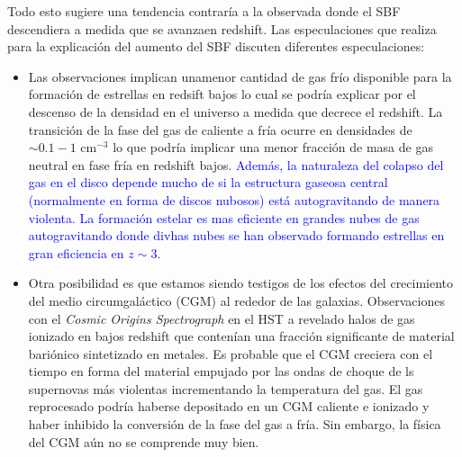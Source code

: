 Todo esto sugiere una tendencia contraría a la observada donde el SBF descendiera a medida que se avanzaen redshift. Las especulaciones que realiza \cite{finkelstein2015increasing} para la explicación del aumento del SBF discuten diferentes especulaciones:
\begin{itemize}
\item Las observaciones implican unamenor cantidad de gas frío disponible para la formación de estrellas en redsift bajos lo cual se podría explicar por el descenso de la densidad en el universo a medida que decrece el redshift. La transición de la fase del gas de caliente a fría ocurre en densidades de $\sim 0.1-1$ cm$^{-3}$ lo que podría implicar una menor fracción de masa de gas neutral en fase fría en redshift bajos. \textcolor{blue}{Además, la naturaleza del colapso del gas en el disco depende mucho de si la estructura gaseosa central (normalmente en forma de discos nubosos) está autogravitando de manera violenta. La formación estelar es mas eficiente en grandes nubes de gas autogravitando donde divhas nubes se han observado formando estrellas en gran eficiencia en $z\sim 3$}.

\item Otra posibilidad es que estamos siendo testigos de los efectos del crecimiento del medio circumgaláctico (CGM) al rededor de las galaxias. Observaciones con el \textit{Cosmic Origins Spectrograph} en el HST a revelado halos de gas ionizado en bajos redshift que contenían una fracción significante de material bariónico sintetizado en metales. Es probable que el CGM creciera con el tiempo en forma del material empujado por las ondas de choque de ls supernovas más violentas incrementando la temperatura del gas. El gas reprocesado podría haberse depositado en un CGM caliente e ionizado y haber inhibido la conversión de la fase del gas a fría. Sin embargo, la física del CGM aún no se comprende muy bien.\\


\end{itemize}

